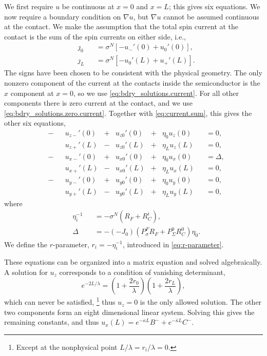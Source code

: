 We first require $u$ be continuous at $x = 0$ and $x = L$;
this gives six equations.
We now require a boundary condition on $∇u$,
but $∇u$ cannot be assumed continuous at the contact.
We make the assumption that the total spin current at the contact
is the sum of the spin currents on either side, i.e.,
\begin{subequations}\label{eq:current.sum}
  \begin{alignat}{2}
    & ȷ_0 && = σ^N \left[ - u_-'(0) + u_0'(0) \right], \\
    & ȷ_L && = σ^N \left[ - u_0'(L) + u_+'(L) \right].
  \end{alignat}
\end{subequations}
The signs have been chosen to be consistent with the physical geometry.
The only nonzero component of the current
at the contacts inside the semiconductor
is the $x$ component at $x = 0$, so we use \cref{eq:bdry_solutions.current}.
For all other components there is zero current at the contact, and we use
\cref{eq:bdry_solutions.zero.current}.
Together with \cref{eq:current.sum}, this gives the other six equations,
\begin{subequations}
  \begin{alignat}{8}
    & - & {} & u_{z-}'(0) & {}+{} & u_{z0}'(0) & {}+{} & η_0 u_z(0) && = 0, \\
    &   & {} & u_{z+}'(L) & {}-{} & u_{z0}'(L) & {}+{} & η_L u_z(L) && = 0, \\
    & - & {} & u_{x-}'(0) & {}+{} & u_{x0}'(0) & {}+{} & η_0 u_x(0) && = Δ, \\
    &   & {} & u_{x+}'(L) & {}-{} & u_{x0}'(L) & {}+{} & η_L u_x(L) && = 0, \\
    & - & {} & u_{y-}'(0) & {}+{} & u_{y0}'(0) & {}+{} & η_0 u_y(0) && = 0, \\
    &   & {} & u_{y+}'(L) & {}-{} & u_{y0}'(L) & {}+{} & η_L u_y(L) && = 0,
  \end{alignat}
\end{subequations}
where
\begin{subequations}
  \begin{alignat}{2}
    & η_i^{-1} && = - σ^N \left( R_F + R_C^i \right), \\
    & Δ && = - (- J_0) \left( P_σ^F R_F + P_Σ^0 R_C^0 \right) η_0.
  \end{alignat}
\end{subequations}
We define the $r$-parameter, $r_i = - η_i^{-1}$,
introduced in \cref{eq:r-parameter}.

These equations can be organized
into a matrix equation and solved algebraically.
A solution for $u_z$ corresponds to a condition of vanishing determinant,
\begin{equation}
  e^{-2 L / λ}
  = \left( 1 + \frac{2 r_0}{λ} \right) \left( 1 + \frac{2 r_L}{λ} \right),
\end{equation}
which can never be satisfied,%
\footnote{%
  Except at the nonphysical point $L / λ = r_i / λ = 0$.
}
thus $u_z = 0$ is the only allowed solution.
The other two components form an eight dimensional linear system.
Solving this gives the remaining constants, and thus
$u_x (L) = e^{- κ L} B^- + e^{- \bar{κ} L} C^-$.


